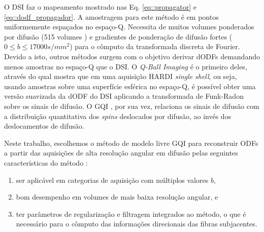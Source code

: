 \documentclass[
    12pt,                %
    oneside,            %
    a4paper,            %
    english,            %
    french,                %
    spanish,            %
    brazil                %
    ]{abntex2}
\begin{document}
O DSI \cite{wedeen2005} faz o mapeamento mostrado nas Eq. \ref{eq::propagator} e \ref{eq::dodf_propagador}. A amostragem para este método é em pontos uniformemente espaçados no espaço-Q. Necessita de muitos volumes ponderados por difusão (515 volumes \cite{wedeen2005}) e gradientes de ponderação de difusão fortes ($0 \leq b \leq 17000 s/mm^2$) para o cômputo da transformada discreta de Fourier. Devido a isto, outros métodos surgem com o objetivo derivar dODFs demandando menos amostras no espaço-Q que o DSI.
O \textit{Q-Ball Imaging} é o primeiro deles, através do qual  mostra que em uma aquisição HARDI \textit{single shell}, ou seja, usando amostras sobre uma superfície esférica no espaço-Q, é possível obter uma versão suavizada da dODF do DSI aplicando a transformada de Funk-Radon sobre os sinais de difusão. O GQI \cite{yeh2010}, por sua vez, relaciona os sinais de difusão com a distribuição quantitativa dos \textit{spins} deslocados por difusão, ao invés dos deslocamentos de difusão.


Neste trabalho, escolhemos o método de modelo livre GQI para reconstruir ODFs a partir das aquisições de alta resolução angular em difusão pelas seguintes características do método \cite{yeh2010}:

\begin{enumerate}
    \item ser aplicável em categorias de aquisição com múltiplos valores $b$,
    \item bom desempenho em volumes de mais baixa resolução angular, e
    \item ter parâmetros de regularização e filtragem integrados ao método, o que é necessário para o cômputo das informações direcionais das fibras subjacentes.
\end{enumerate}

\end{document}
